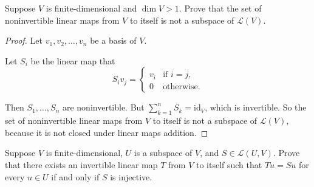 \begin{exercise}
    Suppose $V$ is finite-dimensional and $\dim V > 1$. Prove that the set of noninvertible linear maps from $V$ to itself is not a subspace of $\mathcal{L}(V)$.
\end{exercise}

\begin{proof}
    Let $v_{1}, v_{2}, \ldots, v_{n}$ be a basis of $V$.

    Let $S_{i}$ be the linear map that
    \[
        S_{i}v_{j} = \begin{cases}
            v_{i} & \text{if $i = j$}, \\
            0     & \text{otherwise}.
        \end{cases}
    \]

    Then $S_{1}, \ldots, S_{n}$ are noninvertible. But $\sum^{n}_{k=1}S_{k} = \text{id}_{V}$, which is invertible. So the set of noninvertible linear maps from $V$ to itself is not a subspace of $\mathcal{L}(V)$, because it is not closed under linear maps addition.
\end{proof}
\newpage

\begin{exercise}
    Suppose $V$ is finite-dimensional, $U$ is a subspace of $V$, and $S \in \mathcal{L}(U, V)$. Prove that there exists an invertible linear map $T$ from $V$ to itself such that $Tu = Su$ for every $u\in U$ if and only if $S$ is injective.
\end{exercise}

